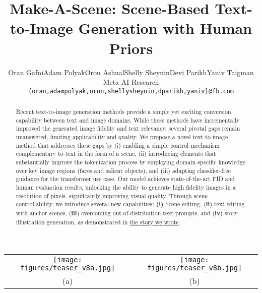 \documentclass[final]{cvpr}
\begin{document}
\title{Make-A-Scene: Scene-Based Text-to-Image Generation with Human Priors}

\author{Oran Gafni\quad Adam Polyak\quad Oron Ashual\quad Shelly Sheynin\quad Devi Parikh\quad Yaniv Taigman\\
Meta AI Research\\
{\tt\small {\{oran,adampolyak,oron,shellysheynin,dparikh,yaniv\}@fb.com}}\vspace{-1cm}}

\maketitle


\begin{strip}\centering
  \centering
  \begin{tabular}{c@{~~~~~~}c}
  \texttt{[image: figures/teaser\_v8a.jpg]} & 
  \texttt{[image: figures/teaser\_v8b.jpg]} \\
  (a) & (b)
  \end{tabular}
  \label{fig:teaser}
\end{strip}


\begin{abstract}\vspace{-0.2cm}
Recent text-to-image generation methods provide a simple yet exciting conversion capability between text and image domains. While these methods have incrementally improved the generated image fidelity and text relevancy, several pivotal gaps remain unanswered, limiting applicability and quality.
We propose a novel text-to-image method that addresses these gaps by (i) enabling a simple control mechanism complementary to text in the form of a scene, (ii) introducing elements that substantially improve the tokenization process by employing domain-specific knowledge over key image regions (faces and salient objects), and (iii) adapting classifier-free guidance for the transformer use case. 
Our model achieves state-of-the-art FID and human evaluation results, unlocking the ability to generate high fidelity images in a resolution of  pixels, significantly improving visual quality. 
Through scene controllability, we introduce several new capabilities: \textbf{(i)} Scene editing, (\textbf{ii}) text editing with anchor scenes, (\textbf{iii}) overcoming out-of-distribution text prompts, and (\textbf{iv}) story illustration generation, as demonstrated in \href{https://youtu.be/QLTyqoJJKTo}{the story we wrote}.
\end{abstract}
\end{document}
